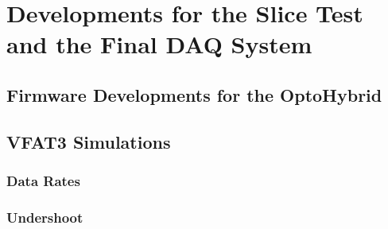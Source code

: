 \chapter{Developments for the Slice Test and the Final DAQ System}
\label{chap:II-4-slice-test}

\section{Firmware Developments for the OptoHybrid}

\section{VFAT3 Simulations}

  \subsection{Data Rates}

  \subsection{Undershoot}
